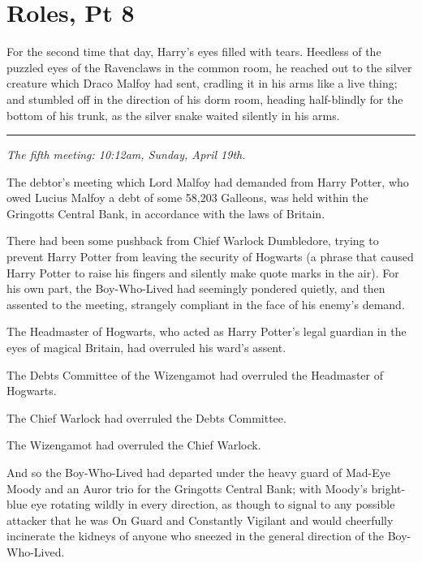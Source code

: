 \chapter{Roles, Pt 8}

For the second time that day, Harry's eyes filled with tears. Heedless
of the puzzled eyes of the Ravenclaws in the common room, he reached out
to the silver creature which Draco Malfoy had sent, cradling it in his
arms like a live thing; and stumbled off in the direction of his dorm
room, heading half-blindly for the bottom of his trunk, as the silver
snake waited silently in his arms.

\begin{center}\rule{3in}{0.4pt}\end{center}

\emph{The fifth meeting: 10:12am, Sunday, April 19th.}

The debtor's meeting which Lord Malfoy had demanded from Harry Potter,
who owed Lucius Malfoy a debt of some 58,203 Galleons, was held within
the Gringotts Central Bank, in accordance with the laws of Britain.

There had been some pushback from Chief Warlock Dumbledore, trying to
prevent Harry Potter from leaving the security of Hogwarts (a phrase
that caused Harry Potter to raise his fingers and silently make quote
marks in the air). For his own part, the Boy-Who-Lived had seemingly
pondered quietly, and then assented to the meeting, strangely compliant
in the face of his enemy's demand.

The Headmaster of Hogwarts, who acted as Harry Potter's legal guardian
in the eyes of magical Britain, had overruled his ward's assent.

The Debts Committee of the Wizengamot had overruled the Headmaster of
Hogwarts.

The Chief Warlock had overruled the Debts Committee.

The Wizengamot had overruled the Chief Warlock.

And so the Boy-Who-Lived had departed under the heavy guard of Mad-Eye
Moody and an Auror trio for the Gringotts Central Bank; with Moody's
bright-blue eye rotating wildly in every direction, as though to signal
to any possible attacker that he was On Guard and Constantly Vigilant
and would cheerfully incinerate the kidneys of anyone who sneezed in the
general direction of the Boy-Who-Lived.

